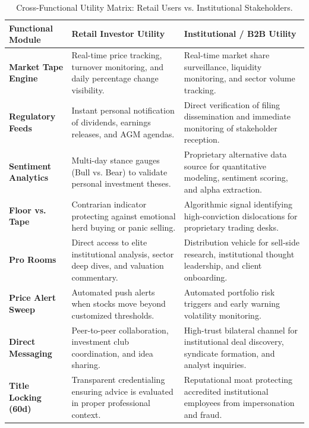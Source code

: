 \documentclass[11pt,a4paper]{article}
\begin{document}
\begin{table}[h!]
\centering
\small
\begin{tabularx}{\textwidth}{l X X}
\toprule
\textbf{Functional Module} & \textbf{Retail Investor Utility} & \textbf{Institutional / B2B Utility} \\
\midrule
\textbf{Market Tape Engine} & Real-time price tracking, turnover monitoring, and daily percentage change visibility. & Real-time market share surveillance, liquidity monitoring, and sector volume tracking. \\
\addlinespace
\textbf{Regulatory Feeds} & Instant personal notification of dividends, earnings releases, and AGM agendas. & Direct verification of filing dissemination and immediate monitoring of stakeholder reception. \\
\addlinespace
\textbf{Sentiment Analytics} & Multi-day stance gauges (Bull vs. Bear) to validate personal investment theses. & Proprietary alternative data source for quantitative modeling, sentiment scoring, and alpha extraction. \\
\addlinespace
\textbf{Floor vs. Tape} & Contrarian indicator protecting against emotional herd buying or panic selling. & Algorithmic signal identifying high-conviction dislocations for proprietary trading desks. \\
\addlinespace
\textbf{Pro Rooms} & Direct access to elite institutional analysis, sector deep dives, and valuation commentary. & Distribution vehicle for sell-side research, institutional thought leadership, and client onboarding. \\
\addlinespace
\textbf{Price Alert Sweep} & Automated push alerts when stocks move beyond customized thresholds. & Automated portfolio risk triggers and early warning volatility monitoring. \\
\addlinespace
\textbf{Direct Messaging} & Peer-to-peer collaboration, investment club coordination, and idea sharing. & High-trust bilateral channel for institutional deal discovery, syndicate formation, and analyst inquiries. \\
\addlinespace
\textbf{Title Locking (60d)} & Transparent credentialing ensuring advice is evaluated in proper professional context. & Reputational moat protecting accredited institutional employees from impersonation and fraud. \\
\bottomrule
\end{tabularx}
\caption{Cross-Functional Utility Matrix: Retail Users vs. Institutional Stakeholders.}
\end{table}
\end{document}
